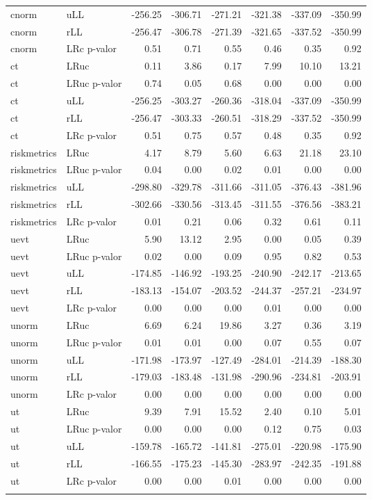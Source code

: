 \begin{longtable}{llrrrrrr}
  cnorm & uLL & -256.25 & -306.71 & -271.21 & -321.38 & -337.09 & -350.99 \\ 
  cnorm & rLL & -256.47 & -306.78 & -271.39 & -321.65 & -337.52 & -350.99 \\ 
  cnorm & LRc p-valor & 0.51 & 0.71 & 0.55 & 0.46 & 0.35 & 0.92 \\ 
  ct & LRuc & 0.11 & 3.86 & 0.17 & 7.99 & 10.10 & 13.21 \\ 
  ct & LRuc p-valor & 0.74 & 0.05 & 0.68 & 0.00 & 0.00 & 0.00 \\ 
  ct & uLL & -256.25 & -303.27 & -260.36 & -318.04 & -337.09 & -350.99 \\ 
  ct & rLL & -256.47 & -303.33 & -260.51 & -318.29 & -337.52 & -350.99 \\ 
  ct & LRc p-valor & 0.51 & 0.75 & 0.57 & 0.48 & 0.35 & 0.92 \\ 
  riskmetrics & LRuc & 4.17 & 8.79 & 5.60 & 6.63 & 21.18 & 23.10 \\ 
  riskmetrics & LRuc p-valor & 0.04 & 0.00 & 0.02 & 0.01 & 0.00 & 0.00 \\ 
  riskmetrics & uLL & -298.80 & -329.78 & -311.66 & -311.05 & -376.43 & -381.96 \\ 
  riskmetrics & rLL & -302.66 & -330.56 & -313.45 & -311.55 & -376.56 & -383.21 \\ 
  riskmetrics & LRc p-valor & 0.01 & 0.21 & 0.06 & 0.32 & 0.61 & 0.11 \\ 
  uevt & LRuc & 5.90 & 13.12 & 2.95 & 0.00 & 0.05 & 0.39 \\ 
  uevt & LRuc p-valor & 0.02 & 0.00 & 0.09 & 0.95 & 0.82 & 0.53 \\ 
  uevt & uLL & -174.85 & -146.92 & -193.25 & -240.90 & -242.17 & -213.65 \\ 
  uevt & rLL & -183.13 & -154.07 & -203.52 & -244.37 & -257.21 & -234.97 \\ 
  uevt & LRc p-valor & 0.00 & 0.00 & 0.00 & 0.01 & 0.00 & 0.00 \\ 
  unorm & LRuc & 6.69 & 6.24 & 19.86 & 3.27 & 0.36 & 3.19 \\ 
  unorm & LRuc p-valor & 0.01 & 0.01 & 0.00 & 0.07 & 0.55 & 0.07 \\ 
  unorm & uLL & -171.98 & -173.97 & -127.49 & -284.01 & -214.39 & -188.30 \\ 
  unorm & rLL & -179.03 & -183.48 & -131.98 & -290.96 & -234.81 & -203.91 \\ 
  unorm & LRc p-valor & 0.00 & 0.00 & 0.00 & 0.00 & 0.00 & 0.00 \\ 
  ut & LRuc & 9.39 & 7.91 & 15.52 & 2.40 & 0.10 & 5.01 \\ 
  ut & LRuc p-valor & 0.00 & 0.00 & 0.00 & 0.12 & 0.75 & 0.03 \\ 
  ut & uLL & -159.78 & -165.72 & -141.81 & -275.01 & -220.98 & -175.90 \\ 
  ut & rLL & -166.55 & -175.23 & -145.30 & -283.97 & -242.35 & -191.88 \\ 
  ut & LRc p-valor & 0.00 & 0.00 & 0.01 & 0.00 & 0.00 & 0.00 \\ 
   \hline
\hline
\label{tab:vartest}
\end{longtable}
